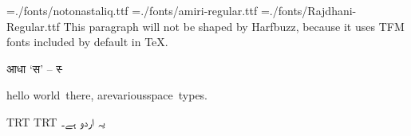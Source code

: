 
\nopagenumbers
\parindent=0mm
\font\noto={./fonts/notonastaliq.ttf}
\font\amiri={./fonts/amiri-regular.ttf}
\font\raj={./fonts/Rajdhani-Regular.ttf}
This paragraph will not be shaped by Harfbuzz, because it uses TFM fonts included by default in \TeX.

\raj
आधा ‘स’ – स्‍

\amiri
hello world~there, are\quad various\qquad space\ types.

\textdir TRT
\pardir TRT
\noto
یہ اردو ہے۔
\bye
